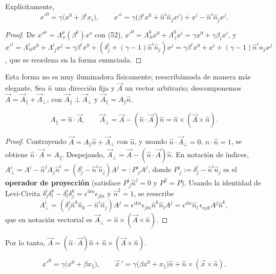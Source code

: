 \begin{proposicionc}
Explícitamente,
\[
x'^0 = \gamma\big(x^0+\beta^ix_i\big), \qquad x'^i = \gamma\big(\beta^i
x^0+\hat n^i\hat n_jx^j\big) + x^i - \hat n^i\hat n_jx^j .
\]
\end{proposicionc}

\begin{proof}
De $x'^\mu=\Lambda^\mu_{\ \nu}(\beta^k)x^\nu$ con (52),
$x'^0=\Lambda^0_{\ 0}x^0+\Lambda^0_{\ i}x^i = \gamma x^0+\gamma\beta_i
x^i$, y $x'^i = \Lambda^i_{\ 0}x^0+\Lambda^i_{\ j}x^j = \gamma\beta^i
x^0 + (\delta^i_j+(\gamma-1)\hat n^i\hat n_j)x^j = \gamma\beta^ix^0+x^i+
(\gamma-1)\hat n^i\hat n_jx^j$, que se reordena en la forma enunciada.
\qedhere
\end{proof}

Esta forma no es muy iluminadora físicamente; reescribámosla de manera
más elegante. Sea $\hat n$ una dirección fija y $\vec A$ un vector
arbitrario; descomponemos $\vec A = \vec A_\parallel + \vec A_\perp$,
con $\vec A_\parallel\perp\vec A_\perp$ y $\vec A_\parallel=A_\parallel
\hat n$.

\begin{proposicionc}
\[
A_\parallel = \hat n\cdot\vec A, \qquad \vec A_\perp = \vec A - (\hat
n\cdot\vec A)\hat n = \hat n\times(\vec A\times\hat n) .
\]
\end{proposicionc}

\begin{proof}
Contrayendo $\vec A=A_\parallel\hat n+\vec A_\perp$ con $\hat n$, y
usando $\hat n\cdot\vec A_\perp=0$, $\hat n\cdot\hat n=1$, se obtiene
$\hat n\cdot\vec A = A_\parallel$. Despejando, $\vec A_\perp = \vec A -
(\hat n\cdot\vec A)\hat n$. En notación de índices,
$A^i_\perp = A^i-\hat n^j A_j\hat n^i = (\delta^i_j-\hat n^i\hat
n_j)A^j =: P^i_{\ j}A^j$, donde $P^i_{\ j}:=\delta^i_j-\hat n^i\hat n_j$
es el \textbf{operador de proyección} (satisface $P^i_{\ j}\hat n^j=0$ y
$P^2=P$). Usando la identidad de Levi-Civita
$\delta^i_j\delta^k_l-\delta^i_l\delta^k_j = \epsilon^{ikn}
\epsilon_{jln}$ y $\hat n^2=1$, se reescribe
\[
A^i_\perp = (\delta^i_j\hat n^k\hat n_k - \hat n^i\hat n_j)A^j =
\epsilon^{ikn}\epsilon_{jln}\hat n^k\hat n_lA^j = \epsilon^{iln}\hat
n_l\,\epsilon_{njk}A^j\hat n^k,
\]
que en notación vectorial es $\vec A_\perp = \hat n\times(\vec A\times
\hat n)$. \qedhere
\end{proof}

Por lo tanto, $\vec A = (\hat n\cdot\vec A)\hat n + \hat n\times(\vec
A\times\hat n)$.

\begin{proposicionc}
\[
x'^0 = \gamma\big(x^0+\beta x_\parallel\big), \qquad \vec x\,' =
\gamma\big(\beta x^0+x_\parallel\big)\hat n + \hat n\times(\vec
x\times\hat n) . \tag{64}
\]
\end{proposicionc}

